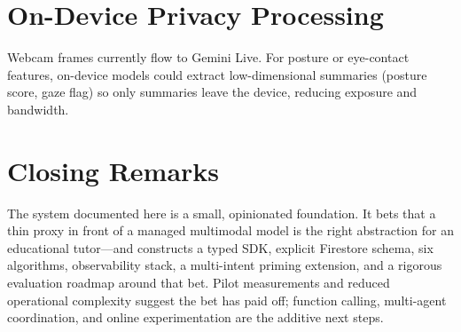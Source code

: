 \section{On-Device Privacy Processing}
\label{sec:on-device}

Webcam frames currently flow to Gemini Live. For posture or eye-contact features, on-device models could extract low-dimensional summaries (posture score, gaze flag) so only summaries leave the device, reducing exposure and bandwidth.

\section{Closing Remarks}
\label{sec:closing}

The system documented here is a small, opinionated foundation. It bets that a thin proxy in front of a managed multimodal model is the right abstraction for an educational tutor---and constructs a typed SDK, explicit Firestore schema, six algorithms, observability stack, a multi-intent priming extension, and a rigorous evaluation roadmap around that bet. Pilot measurements and reduced operational complexity suggest the bet has paid off; function calling, multi-agent coordination, and online experimentation are the additive next steps.
